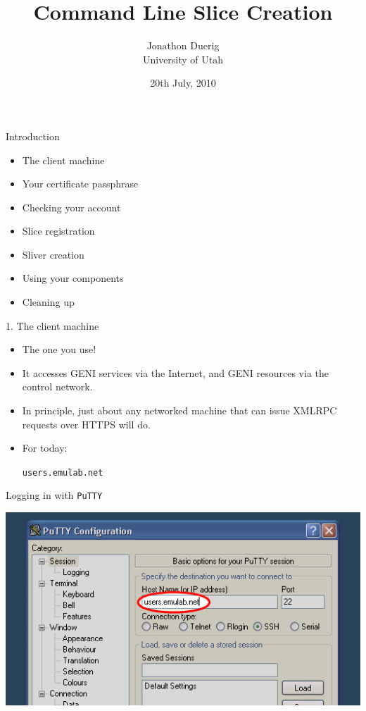 \documentclass[landscape]{slides}
\title{Command Line Slice Creation}
\author{Jonathon Duerig\\ University of Utah}
\date{20th July, 2010}
\newcommand{\heading}[1]{{\fontseries{b}\selectfont\begin{center}{\LARGE\color{red} #1}\end{center}}}
\newcommand{\code}[1]{\begin{center}{\tt #1}\end{center}}
\begin{document}
\selectfont
\maketitle

\begin{slide}
\heading{Introduction}
\begin{small}
\begin{itemize}
\item The client machine
\item Your certificate passphrase
\item Checking your account
\item Slice registration
\item Sliver creation
\item Using your components
\item Cleaning up
\end{itemize}
\end{small}
\end{slide}

\begin{slide}
\heading{1. The client machine}
\begin{itemize}
\item The one you use!
\item It accesses GENI services via the Internet, and GENI resources via the
  control network.
\item In principle, just about any networked machine that can issue
  XMLRPC requests over HTTPS will do.
\item For today:
\code{users.emulab.net}
\end{itemize}
\end{slide}

\begin{slide}
\heading{Logging in with {\tt PuTTY}}
\begin{center}
\includegraphics[width=17cm]{putty-1}
\end{center}
\end{slide}
\end{document}

